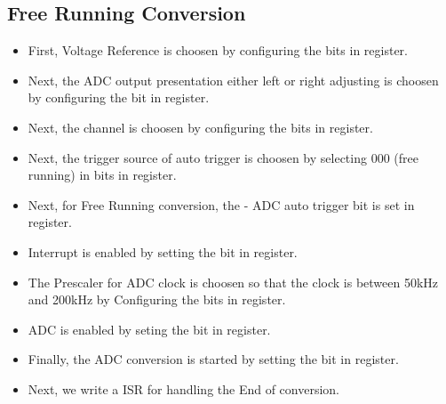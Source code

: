 \subsection{Free Running Conversion}
\begin{itemize}
    \item First, Voltage Reference is choosen by configuring the  bits in  register.
    \item Next, the ADC output presentation either left or right adjusting is choosen by configuring the  bit in  register.
    \item Next, the channel is choosen by configuring the  bits in  register.
    \item Next, the trigger source of auto trigger is choosen by selecting 000 (free running) in  bits in  register.
    \item Next, for Free Running conversion, the  - ADC auto trigger bit is set in  register.
    \item Interrupt is enabled by setting the  bit in  register.
    \item The Prescaler for ADC clock is choosen so that the clock is  between 50kHz and 200kHz  by Configuring the  bits in  register.
    \item ADC is enabled by seting the  bit in  register.
    \item Finally, the ADC conversion is started by setting the  bit in   register.
    \item Next, we write a ISR for handling the End of conversion.
\end{itemize}

